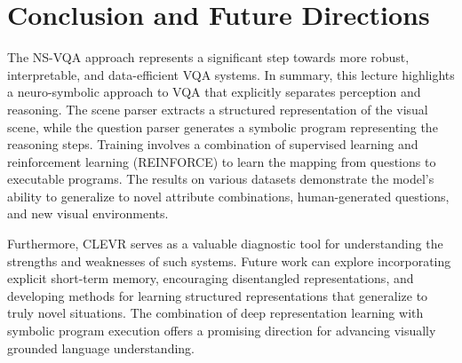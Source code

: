 \documentclass[10pt, oneside]{article}
\begin{document}
\pagebreak

\section{Conclusion and Future Directions}
The NS-VQA approach represents a significant step towards more robust, interpretable, and data-efficient VQA systems. In summary, this lecture highlights a neuro-symbolic approach to VQA that explicitly separates perception and reasoning. The scene parser extracts a structured representation of the visual scene, while the question parser generates a symbolic program representing the reasoning steps. Training involves a combination of supervised learning and reinforcement learning (REINFORCE) to learn the mapping from questions to executable programs. The results on various datasets demonstrate the model's ability to generalize to novel attribute combinations, human-generated questions, and new visual environments.

Furthermore, CLEVR serves as a valuable diagnostic tool for understanding the strengths and weaknesses of such systems. Future work can explore incorporating explicit short-term memory, encouraging disentangled representations, and developing methods for learning structured representations that generalize to truly novel situations. The combination of deep representation learning with symbolic program execution offers a promising direction for advancing visually grounded language understanding.



\end{document}
